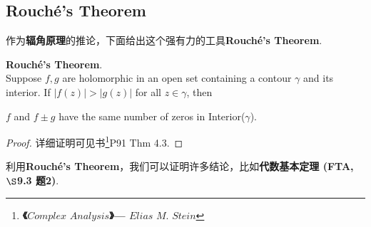 \newpage
\subsection{Rouch\'{e}'s Theorem}
	作为\textbf{辐角原理}的推论，下面给出这个强有力的工具\textbf{Rouch\'{e}'s Theorem}.
	\begin{thm}\label{thm 9.2.2}
		\textbf{Rouch\'{e}'s Theorem}. \\
		Suppose $f , g$ are holomorphic in an open set containing a contour $\gamma$ and its interior. If $\left| f(z) \right| > \left| g(z) \right|$ for all $z \in \gamma$, then
		\begin{center}
			$f$ and $f \pm g$ have the same number of zeros in Interior($\gamma$).
		\end{center}
	
		\vspace{2em}
		\begin{proof}
			详细证明可见书\footnote{\textbf{《$Complex \,\, Analysis$》---  $Elias \,\, M. \,\, Stein$}}P91 Thm 4.3.
		\end{proof}
	\end{thm}

	\vspace{2em}
	利用\textbf{Rouch\'{e}'s Theorem}，我们可以证明许多结论，比如\textbf{代数基本定理 (FTA, $\S$9.3 题2)}.
	
	

\newpage

